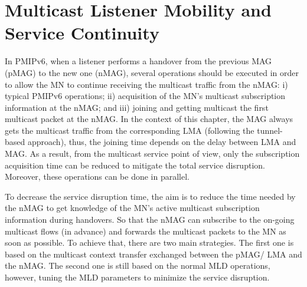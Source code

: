 \section{Multicast Listener Mobility and Service Continuity} \label{section:mlb}
In PMIPv6, when a listener performs a handover from the previous MAG (pMAG) to the new one (nMAG), several operations should be executed in order to allow the MN to continue receiving the multicast traffic from the nMAG: i) typical PMIPv6 operations; ii) acquisition of the MN's multicast subscription information at the nMAG; and iii) joining and getting multicast the first multicast packet at the nMAG. In the context of this chapter, the MAG always gets the multicast traffic from the corresponding LMA (following the tunnel-based approach), thus, the joining time depends on the delay between LMA and MAG. As a result, from the multicast service point of view, only the subscription acquisition time can be reduced to mitigate the total service disruption. Moreover, these operations can be done in parallel. 

To decrease the service disruption time, the aim is to reduce the time needed by the nMAG to get knowledge of the MN's active multicast subscription information during handovers. So that the nMAG can subscribe to the on-going multicast flows (in advance) and forwards the multicast packets to the MN as soon as possible. To achieve that, there are two main strategies. The first one is based on the multicast context transfer exchanged between the pMAG/ LMA and the nMAG. The second one is still based on the normal MLD operations, however, tuning the MLD parameters to minimize the service disruption.

